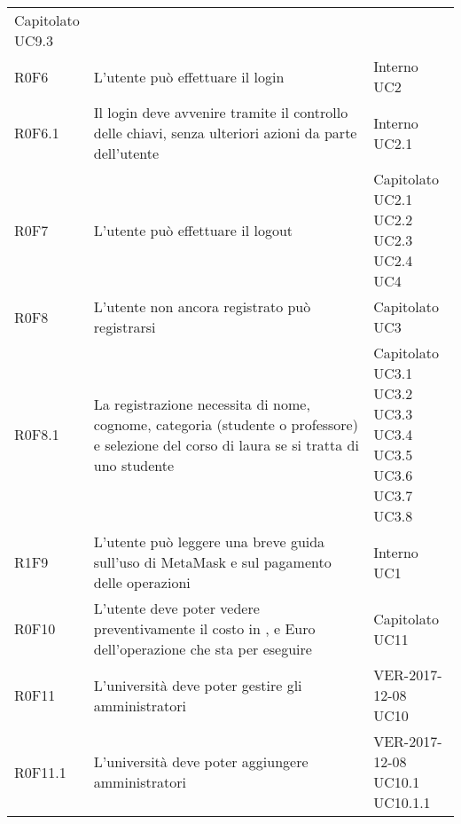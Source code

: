 \documentclass[AnalisiDeiRequisiti.tex]{subfiles}
\begin{document}
\begin{longtable}[H]{p{2cm}p{5.2cm}p{5cm}}
{		Capitolato \\ 
		UC9.3
	} \\  
	R0F6 &  L'utente può effettuare il login & \makecell[tl]{
		Interno \\ 
		UC2
	} \\  
	R0F6.1 &  Il login deve avvenire tramite il controllo delle chiavi, senza ulteriori azioni da parte dell'utente & \makecell[tl]{
		Interno \\ 
		UC2.1
	} \\  
	R0F7 &  L'utente può effettuare il logout & \makecell[tl]{
		Capitolato \\ 
		UC2.1  \\
		UC2.2 \\
		UC2.3 \\
		UC2.4 \\ 
		UC4
	} \\  
	R0F8 &  L'utente non ancora registrato può registrarsi & \makecell[tl]{
		Capitolato \\ 
		UC3
	} \\  
	R0F8.1 &  La registrazione necessita di nome, cognome, categoria (studente o professore) e selezione del corso di laura se si tratta di uno studente & \makecell[tl]{
		Capitolato \\
		UC3.1 \\
		UC3.2 \\
		UC3.3 \\
		UC3.4 \\
		UC3.5 \\
		UC3.6 \\
		UC3.7 \\
		UC3.8
	} \\  
	R1F9 &  L'utente può leggere una breve guida sull'uso di MetaMask e sul pagamento delle operazioni & \makecell[tl]{
		Interno \\ 
		UC1
	} \\  
	R0F10 &  L'utente deve poter vedere preventivamente il costo in \citGloss{Gas}, \citGloss{Ether} e Euro dell'operazione che sta per eseguire & \makecell[tl]{
		Capitolato \\
		UC11
	} \\  
	R0F11 &  L'università deve poter gestire gli amministratori & \makecell[tl]{
		VER-2017-12-08 \\
		UC10
	} \\  
	R0F11.1 &  L'università deve poter aggiungere amministratori & \makecell[tl]{
		VER-2017-12-08 \\
		UC10.1 \\
		UC10.1.1 \\ 
}
\end{longtable}
\end{document}
